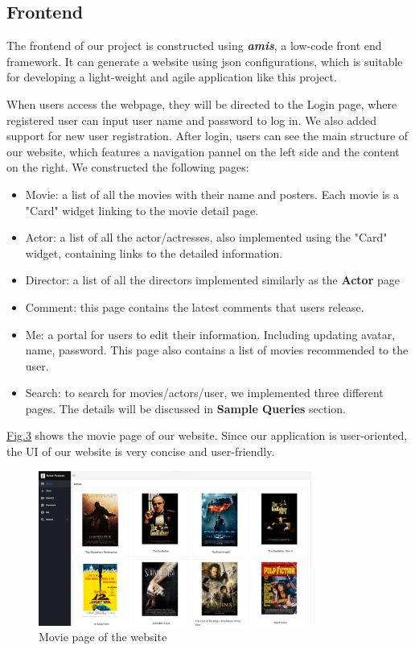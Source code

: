 \begin{CJK*}{UTF8}{gbsn}
\subsection{Frontend}
The frontend of our project is constructed using \textbf{\textit{amis}}, a low-code front end framework. It can generate a website using json configurations, which is suitable for developing a light-weight and agile application like this project.\par
When users access the webpage, they will be directed to the Login page, where registered user can input user name and password to log in. We also added support for new user registration.
After login, users can see the  main structure of our website, which features a navigation pannel on the left side and the content on the right. We constructed the following pages:
\begin{itemize}
    \item Movie: a list of all the movies with their name and posters. Each movie is a "Card" widget linking to the movie detail page.
    \item Actor: a list of all the actor/actresses, also implemented using the "Card" widget, containing links to the detailed information.
    \item Director: a list of all the directors implemented similarly as the \textbf{Actor} page
    \item Comment: this page contains the latest comments that users release.
    \item Me: a portal for users to edit their information. Including updating avatar, name, password. This page also contains a list of movies recommended to the user.
    \item Search: to search for movies/actors/user, we implemented three different pages. The details will be discussed in \textbf{Sample Queries} section.
\end{itemize}
\par \hyperref[moviePage]{Fig.3} shows the movie page of our website. Since our application is user-oriented, the UI of our website is very concise and user-friendly.\par

\begin{figure}[h]
    \label{moviePage}
    \centering
    \includegraphics[width=0.8\textwidth]{website.png}
    \caption{Movie page of the website}
\end{figure}


\end{CJK*}
